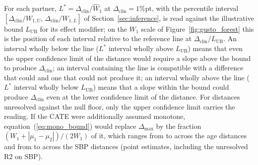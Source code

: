 \documentclass[AMA,Times1COL]{WileyNJDv5}
\begin{document}
For each partner, $L^* = \Delta_{\text{clin}} / \widehat{W}_1$ at $\Delta_{\text{clin}} = 1$\%pt, with the percentile interval $[\Delta_{\text{clin}}/W_{1,U},\, \Delta_{\text{clin}}/W_{1,L}]$ of Section~\ref{sec:inference}, is read against the illustrative bound $L_{\text{UB}}$ for its effect modifier; on the $W_1$ scale of Figure~\ref{fig:gusto_forest} this is the position of each interval relative to the reference line at $\Delta_{\text{clin}} / L_{\text{UB}}$. An interval wholly below the line ($L^*$ interval wholly above $L_{\text{UB}}$) means that even the upper confidence limit of the distance would require a slope above the bound to produce $\Delta_{\text{clin}}$; an interval containing the line is compatible with a difference that could and one that could not produce it; an interval wholly above the line ($L^*$ interval wholly below $L_{\text{UB}}$) means that a slope within the bound could produce $\Delta_{\text{clin}}$ even at the lower confidence limit of the distance. For distances unresolved against the null floor, only the upper confidence limit carries the reading. If the CATE were additionally assumed monotone, equation~(\ref{eq:mono_bound}) would replace $\Delta_{\max}$ by the fraction $(W_1 + |\mu_1 - \mu_2|)/(2 W_1)$ of it, which ranges from  to  across the age distances and from  to  across the SBP distances (point estimates, including the unresolved R2 on SBP).
\end{document}
